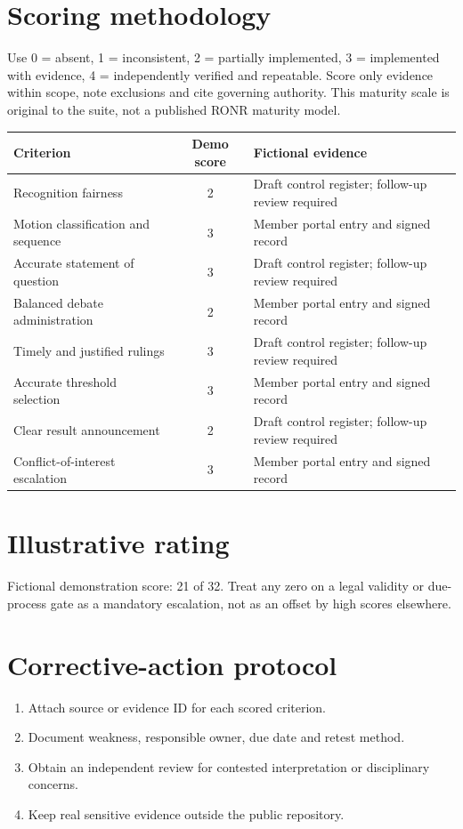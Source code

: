 \documentclass[11pt]{article}
\begin{document}
\SuiteOpen
\section{Scoring methodology}
Use 0 = absent, 1 = inconsistent, 2 = partially implemented, 3 = implemented with evidence, 4 = independently verified and repeatable. Score only evidence within scope, note exclusions and cite governing authority. This maturity scale is original to the suite, not a published RONR maturity model.

\small\begin{longtable}{@{}p{.44\linewidth}cp{.39\linewidth}@{}}\toprule Criterion & Demo score & Fictional evidence\\\midrule\endhead

Recognition fairness & 2 & Draft control register; follow-up review required\\
Motion classification and sequence & 3 & Member portal entry and signed record\\
Accurate statement of question & 3 & Draft control register; follow-up review required\\
Balanced debate administration & 2 & Member portal entry and signed record\\
Timely and justified rulings & 3 & Draft control register; follow-up review required\\
Accurate threshold selection & 3 & Member portal entry and signed record\\
Clear result announcement & 2 & Draft control register; follow-up review required\\
Conflict-of-interest escalation & 3 & Member portal entry and signed record\\
\bottomrule\end{longtable}\normalsize
\section{Illustrative rating}
Fictional demonstration score: 21 of 32. Treat any zero on a legal validity or due-process gate as a mandatory escalation, not as an offset by high scores elsewhere.

\section{Corrective-action protocol}
\begin{enumerate}[leftmargin=*,itemsep=4pt]
\item Attach source or evidence ID for each scored criterion.
\item Document weakness, responsible owner, due date and retest method.
\item Obtain an independent review for contested interpretation or disciplinary concerns.
\item Keep real sensitive evidence outside the public repository.
\end{enumerate}
\end{document}
